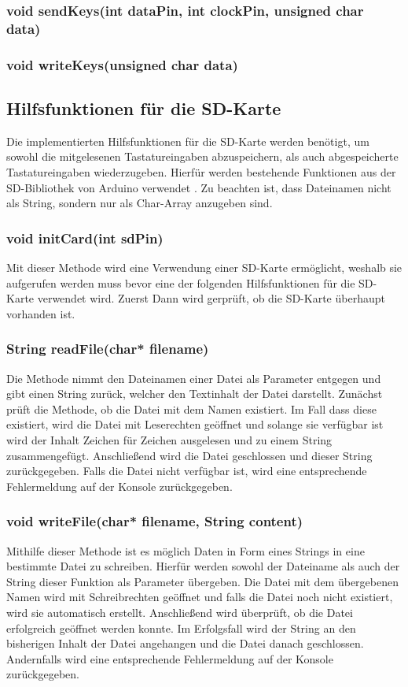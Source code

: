 \subsubsection{void sendKeys(int dataPin, int clockPin, unsigned char data)}
\subsubsection{void writeKeys(unsigned char data)}


\subsection{Hilfsfunktionen für die SD-Karte}
Die implementierten Hilfsfunktionen für die SD-Karte werden benötigt, um sowohl die mitgelesenen Tastatureingaben abzuspeichern, als auch abgespeicherte Tastatureingaben wiederzugeben. Hierfür werden bestehende Funktionen aus der SD-Bibliothek von Arduino verwendet \cite{arduino_sd}. Zu beachten ist, dass Dateinamen nicht als String, sondern nur als Char-Array anzugeben sind.

\subsubsection{void initCard(int sdPin)}
Mit dieser Methode wird eine Verwendung einer SD-Karte ermöglicht, weshalb sie aufgerufen werden muss bevor eine der folgenden Hilfsfunktionen für die SD-Karte verwendet wird. Zuerst Dann wird gerprüft, ob die SD-Karte überhaupt vorhanden ist.

\subsubsection{String readFile(char* filename)}
Die Methode nimmt den Dateinamen einer Datei als Parameter entgegen und gibt einen String zurück, welcher den Textinhalt der Datei darstellt. Zunächst prüft die Methode, ob die Datei mit dem Namen existiert. Im Fall dass diese existiert, wird die Datei mit Leserechten geöffnet und solange sie verfügbar ist wird der Inhalt Zeichen für Zeichen ausgelesen und zu einem String zusammengefügt. Anschließend wird die Datei geschlossen und dieser String zurückgegeben. Falls die Datei nicht verfügbar ist, wird eine entsprechende Fehlermeldung auf der Konsole zurückgegeben.

\subsubsection{void writeFile(char* filename, String content)}
Mithilfe dieser Methode ist es möglich Daten in Form eines Strings in eine bestimmte Datei zu schreiben. Hierfür werden sowohl der Dateiname als auch der String dieser Funktion als Parameter übergeben. Die Datei mit dem übergebenen Namen wird mit Schreibrechten geöffnet und falls die Datei noch nicht existiert, wird sie automatisch erstellt. Anschließend wird überprüft, ob die Datei erfolgreich geöffnet werden konnte. Im Erfolgsfall wird der String an den bisherigen Inhalt der Datei angehangen und die Datei danach geschlossen. Andernfalls wird eine entsprechende Fehlermeldung auf der Konsole zurückgegeben.

